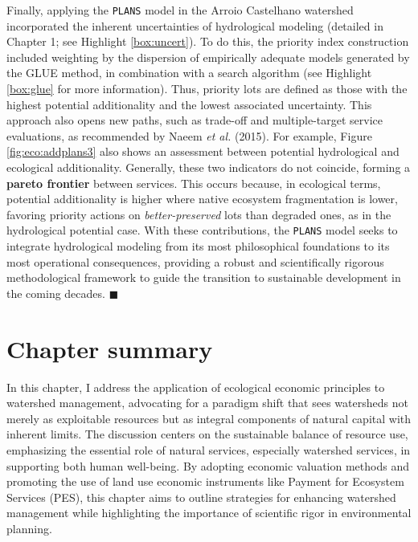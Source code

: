 \documentclass[./main_en.tex]{subfiles}
\begin{document}
Finally, applying the \texttt{PLANS} model in the Arroio Castelhano watershed incorporated the inherent uncertainties of hydrological modeling (detailed in Chapter 1; see Highlight \ref{box:uncert}). To do this, the priority index construction included weighting by the dispersion of empirically adequate models generated by the GLUE method, in combination with a search algorithm (see Highlight \ref{box:glue} for more information). Thus, priority lots are defined as those with the highest potential additionality and the lowest associated uncertainty. This approach also opens new paths, such as trade-off and multiple-target service evaluations, as recommended by Naeem \textit{et al.} (2015). For example, Figure \ref{fig:eco:addplans3} also shows an assessment between potential hydrological and ecological additionality. Generally, these two indicators do not coincide, forming a \textbf{pareto frontier} between services. This occurs because, in ecological terms, potential additionality is higher where native ecosystem fragmentation is lower, favoring priority actions on \textit{better-preserved} lots than degraded ones, as in the hydrological potential case. With these contributions, the \texttt{PLANS} model seeks to integrate hydrological modeling from its most philosophical foundations to its most operational consequences, providing a robust and scientifically rigorous methodological framework to guide the transition to sustainable development in the coming decades. $\blacksquare$


\clearpage

\section{Chapter summary}

\par In this chapter, I address the application of ecological economic principles to watershed management, advocating for a paradigm shift that sees watersheds not merely as exploitable resources but as integral components of natural capital with inherent limits. The discussion centers on the sustainable balance of resource use, emphasizing the essential role of natural services, especially watershed services, in supporting both human well-being. By adopting economic valuation methods and promoting the use of land use economic instruments like Payment for Ecosystem Services (PES), this chapter aims to outline strategies for enhancing watershed management while highlighting the importance of scientific rigor in environmental planning.
\end{document}
